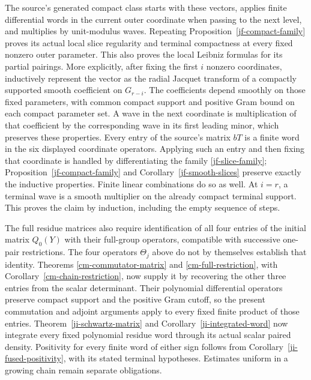 The source's generated compact class starts with these
vectors, applies finite differential words in the current
outer coordinate when passing to the next level, and
multiplies by unit-modulus waves.  Repeating
Proposition~\ref{jf-compact-family} proves its actual local
slice regularity and terminal compactness at every fixed
nonzero outer parameter.  This also proves the local
Leibniz formulas for its partial pairings.  More explicitly,
after fixing the first \(i\) nonzero coordinates, inductively
represent the vector as the radial Jacquet transform of a
compactly supported smooth coefficient on \(G_{r-i}\).
The coefficients depend smoothly on those fixed parameters,
with common compact support and positive Gram bound on
each compact parameter set.  A wave in the next coordinate
is multiplication of that coefficient by the corresponding
wave in its first leading minor, which preserves these
properties.  Every entry of the source's matrix \(bT\)
is a finite word in the six displayed coordinate operators.
Applying such an entry and then fixing that coordinate is
handled by differentiating the family
\eqref{jf-slice-family}; Proposition~\ref{jf-compact-family}
and Corollary~\ref{jf-smooth-slices} preserve exactly the
inductive properties.  Finite linear combinations do so
as well.  At \(i=r\), a terminal wave is a smooth multiplier
on the already compact terminal support.  This proves the
claim by induction, including the empty sequence of steps.

The full residue matrices also require identification of all
four entries of the initial matrix \(Q_0(Y)\) with their
full-group operators, compatible with successive one-pair
restrictions. The four operators \(\Theta_j\) above do not
by themselves establish that identity. Theorems
\ref{cm-commutator-matrix} and \ref{cm-full-restriction}, with
Corollary~\ref{cm-chain-restriction}, now supply it by recovering
the other three entries from the scalar determinant.
Their polynomial differential operators preserve compact support
and the positive Gram cutoff, so the present commutation and
adjoint arguments apply to every fixed finite product of those
entries. Theorem~\ref{ji-schwartz-matrix} and
Corollary~\ref{ji-integrated-word} now integrate every fixed polynomial
residue word through its actual scalar paired density. Positivity for
every finite word of either sign follows from
Corollary~\ref{ji-fused-positivity}, with its stated terminal
hypotheses. Estimates uniform in a growing chain remain separate
obligations.


